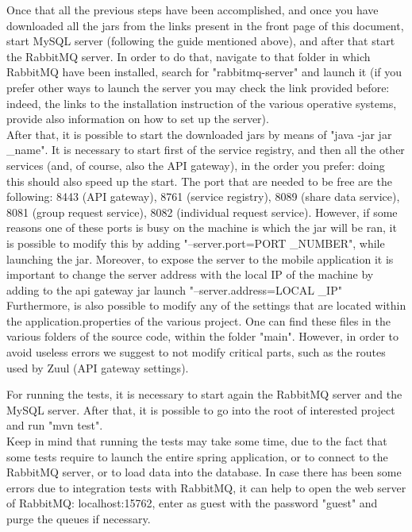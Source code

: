 Once that all the previous steps have been accomplished, and once you have downloaded all the jars from the links present in the front page
of this document, start MySQL server (following the guide mentioned above), and after that start the RabbitMQ server. In order to do that, 
navigate to that folder in which RabbitMQ have been installed, search for "rabbitmq-server" and launch it (if you prefer other ways to launch
the server you may check the link provided before: indeed, the links to the installation instruction of the various operative systems,
provide also information on how to set up the server). \\
After that, it is possible to start the downloaded jars by means of "java -jar jar \_name". 
It is necessary to start first of the service registry, and then all the other services (and, of course, also the API gateway), in the
order you prefer: doing this should also speed up the start. 
The port that are needed to be free are the following: 8443 (API gateway), 8761 (service registry), 8089 (share data service), 8081 (group
request service), 8082 (individual request service). However, if some reasons one of these ports is busy on the
machine is which the jar will be ran, it is possible to modify this by adding "--server.port=PORT \_NUMBER", while launching the jar. Moreover, to expose the server to the mobile application it is important to change the server address with the local IP of the machine by adding to the api gateway jar launch "--server.address=LOCAL \_IP" \\
Furthermore, is also possible to modify any of the settings that are located within the application.properties of the various project.
One can find these files in the various folders of the source code, within the folder "main". However, in order to avoid useless errors
we suggest to not modify critical parts, such as the routes used by Zuul (API gateway settings). \\

\par 
For running the tests, it is necessary to start again the RabbitMQ server and the MySQL server. After that, it is possible to go into
the root of interested project and run "mvn test". \\
Keep in mind that running the tests may take some time, due to the fact that some tests require to launch the entire spring application,
or to connect to the RabbitMQ server, or to load data into the database. In case there has been some errors due to integration 
tests with RabbitMQ, it can help to open the web server of RabbitMQ: localhost:15762, enter as guest with the password "guest" 
and purge the queues if necessary.

